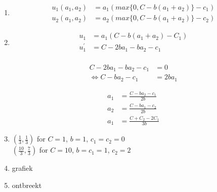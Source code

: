 \documentclass[../main.tex]{subfiles}
\begin{document}
\begin{solution}
	\begin{enumerate}
	\item
		\begin{align}
		u_1(a_1,a_2)& = a_1(max\{0,C-b(a_1+a_2)\} - c_1)\\
		u_2(a_1,a_2)& = a_2(max\{0,C-b(a_1+a_2)\} - c_2)
		\end{align}
		
		
	\item 
		\begin{align}
		u_1& = a_1(C-b(a_1+a_2) - C_1)\\
		u_1^{'}& = C - 2ba_1 - ba_2 - c_1\\
		\end{align}
		
		\begin{align}
		C - 2ba_1 - ba_2 - c_1& = 0\\
		\Leftrightarrow C-ba_2-c_1& = 2ba_1
		\end{align}
		
		\begin{align}
		a_1& = \frac{C-ba_2 - c_1}{2b}\\
		a_2& = \frac{C - ba_1 - c_2}{2b}\\
		a_1& = \frac{C+C_2 - 2C_1}{3b}
		\end{align}
		
	\item
		$(\frac{1}{3},\frac{1}{3})$ for $C = 1$, $b = 1$, $c_1 = c_2 = 0$\\
		$(\frac{10}{3},\frac{7}{3})$ for $C = 10$, $b = c_1 = 1$, $c_2 = 2$
	
	\item grafiek %
	\item ontbreekt %
	\end{enumerate}
\end{solution}

\begin{question}
\end{question}

\begin{solution}
\end{solution}

\begin{question}
\end{question}

\begin{solution}
\end{solution}

\begin{question}
\end{question}

\begin{solution}
\end{solution}

\begin{question}
\end{question}

\begin{solution}
\end{solution}
\end{document}
